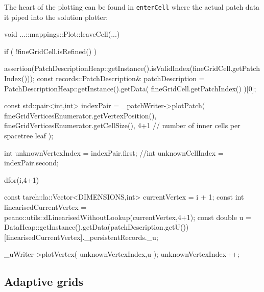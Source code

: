 \noindent
The heart of the plotting can be found in \texttt{enterCell} where the
actual patch data it piped into the solution plotter:


\begin{code}
void ...::mappings::Plot::leaveCell(...) {
 if ( !fineGridCell.isRefined() ) {
  assertion(PatchDescriptionHeap::getInstance().isValidIndex(fineGridCell.getPatchIndex()));
  const records::PatchDescription& patchDescription   
   = PatchDescriptionHeap::getInstance().getData( fineGridCell.getPatchIndex() )[0];

  const std::pair<int,int> indexPair = _patchWriter->plotPatch(
    fineGridVerticesEnumerator.getVertexPosition(),
    fineGridVerticesEnumerator.getCellSize(),
    4+1 // number of inner cells per spacetree leaf
  );

  int unknownVertexIndex = indexPair.first;
  //int unknownCellIndex   = indexPair.second;

  dfor(i,4+1) {
   const tarch::la::Vector<DIMENSIONS,int> currentVertex = i + 1;
   const int linearisedCurrentVertex 
    = peano::utils::dLinearisedWithoutLookup(currentVertex,4+1);
   const double u = DataHeap::getInstance().getData(patchDescription.getU())
    [linearisedCurrentVertex]._persistentRecords._u;

    _uWriter->plotVertex( unknownVertexIndex,u );
    unknownVertexIndex++;
  }
 }
}
\end{code}



\subsection{Adaptive grids}

